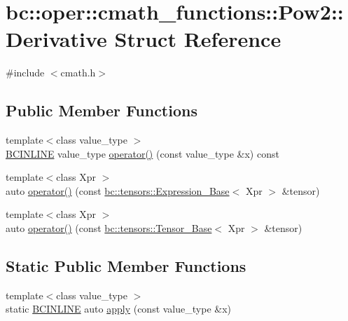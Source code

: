 \hypertarget{structbc_1_1oper_1_1cmath__functions_1_1Pow2_1_1Derivative}{}\section{bc\+:\+:oper\+:\+:cmath\+\_\+functions\+:\+:Pow2\+:\+:Derivative Struct Reference}
\label{structbc_1_1oper_1_1cmath__functions_1_1Pow2_1_1Derivative}


{\ttfamily \#include $<$cmath.\+h$>$}

\subsection*{Public Member Functions}
\begin{DoxyCompactItemize}
\item 
{\footnotesize template$<$class value\+\_\+type $>$ }\\\hyperlink{common_8h_a6699e8b0449da5c0fafb878e59c1d4b1}{B\+C\+I\+N\+L\+I\+NE} value\+\_\+type \hyperlink{structbc_1_1oper_1_1cmath__functions_1_1Pow2_1_1Derivative_a3036033ca42cc0df4a146f952b4c1242}{operator()} (const value\+\_\+type \&x) const
\item 
{\footnotesize template$<$class Xpr $>$ }\\auto \hyperlink{structbc_1_1oper_1_1cmath__functions_1_1Pow2_1_1Derivative_a15aa4eb35d040fe95351135943ccc66c}{operator()} (const \hyperlink{classbc_1_1tensors_1_1Expression__Base}{bc\+::tensors\+::\+Expression\+\_\+\+Base}$<$ Xpr $>$ \&tensor)
\item 
{\footnotesize template$<$class Xpr $>$ }\\auto \hyperlink{structbc_1_1oper_1_1cmath__functions_1_1Pow2_1_1Derivative_a4b2e79ada431200fd6ff1783fbab59bb}{operator()} (const \hyperlink{classbc_1_1tensors_1_1Tensor__Base}{bc\+::tensors\+::\+Tensor\+\_\+\+Base}$<$ Xpr $>$ \&tensor)
\end{DoxyCompactItemize}
\subsection*{Static Public Member Functions}
\begin{DoxyCompactItemize}
\item 
{\footnotesize template$<$class value\+\_\+type $>$ }\\static \hyperlink{common_8h_a6699e8b0449da5c0fafb878e59c1d4b1}{B\+C\+I\+N\+L\+I\+NE} auto \hyperlink{structbc_1_1oper_1_1cmath__functions_1_1Pow2_1_1Derivative_a379a4de61b1fd93601a570d0da2d2bac}{apply} (const value\+\_\+type \&x)
\end{DoxyCompactItemize}



